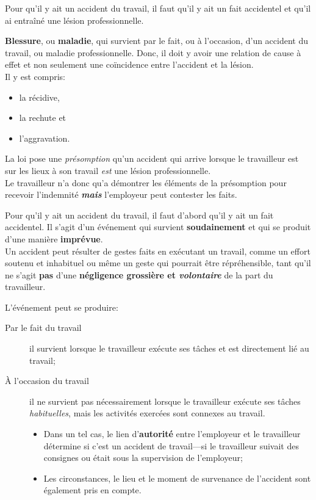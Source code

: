 \documentclass[10pt, french]{article}
\begin{document}
\begin{multicols*}{3}
Pour qu'il y ait un accident du travail, il faut qu'il y ait un fait accidentel et qu'il ai entraîné une lésion professionnelle.

\begin{definitionNOHFILL}
\textbf{Blessure}, ou \textbf{maladie}, qui survient par le fait, ou à l’occasion, d’un accident du travail, ou maladie professionnelle. Donc, il doit y avoir une relation de cause à effet et non seulement une coïncidence entre l'accident et la lésion.\\

Il y  est compris: 
\begin{itemize}[leftmargin = *]
	\item	la récidive, 
	\item	la rechute et 
	\item	l’aggravation.
\end{itemize}

La loi pose une \textit{présomption} qu'un accident qui arrive lorsque le travailleur est sur les lieux à son travail \textit{est} une lésion professionnelle.\\
Le travailleur n'a donc qu'a démontrer les éléments de la présomption pour recevoir l'indemnité \textit{\textbf{mais}} l'employeur peut contester les faits.
\end{definitionNOHFILL}

\begin{definitionNOHFILL}
Pour qu'il y ait un accident du travail, il faut d'abord qu'il y ait un fait accidentel. Il s'agit d'un événement qui survient \textbf{soudainement} et qui se produit d'une manière \textbf{imprévue}. \\

Un accident peut résulter de gestes faits en exécutant un travail, comme un effort soutenu et inhabituel ou même un geste qui pourrait être répréhensible, tant qu'il ne s'agit \textbf{pas} d'une \textbf{négligence grossière et \textit{volontaire}} de la part du travailleur.
\end{definitionNOHFILL}

L'événement peut se produire:
\begin{description}
	\item[Par le fait du travail]	il survient lorsque le travailleur exécute ses tâches et est directement lié au travail;
	\item[À l'occasion du travail]	il ne survient pas nécessairement lorsque le travailleur exécute ses tâches \textit{habituelles}, mais les activités exercées sont connexes au travail.
		\begin{itemize}[leftmargin = *]
		\item	Dans un tel cas, le lien d'\textbf{autorité} entre l'employeur et le travailleur détermine si c'est un accident de travail---si le travailleur suivait des consignes ou était sous la supervision de l'employeur;
		\item	Les circonstances, le lieu et le moment de survenance de l'accident sont également pris en compte.
		\end{itemize}
\end{description}


\end{multicols*}
\end{document}
